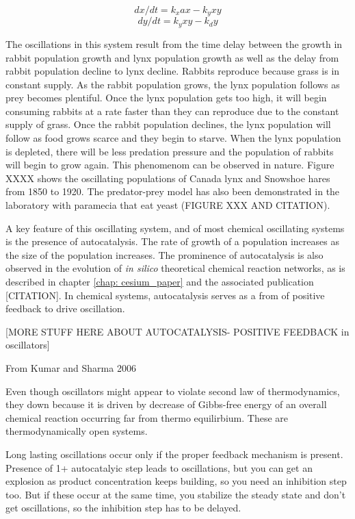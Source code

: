 \documentclass[12pt]{report}
\begin{document}
\begin{equation}
dx/dt = k_{x}ax - k_{y}xy
\end{equation}
\begin{equation}
dy/dt = k_{y}xy - k_{d}y
\end{equation}

The oscillations in this system result from the time delay between the growth in rabbit population growth and lynx population growth as well as the delay from rabbit population decline to lynx decline. Rabbits reproduce because grass is in constant supply. As the rabbit population grows, the lynx population follows as prey becomes plentiful. Once the lynx population gets too high, it will begin consuming rabbits at a rate faster than they can reproduce due to the constant supply of grass. Once the rabbit population declines, the lynx population will follow as food grows scarce and they begin to starve. When the lynx population is depleted, there will be less predation pressure and the population of rabbits will begin to grow again. This phenomenom can be observed in nature. Figure XXXX shows the oscillating populations of Canada lynx and Snowshoe hares from 1850 to 1920. The predator-prey model has also been demonstrated in the laboratory with paramecia that eat yeast (FIGURE XXX AND CITATION).

A key feature of this oscillating system, and of most chemical oscillating systems is the presence of autocatalysis. The rate of growth of a population increases as the size of the population increases. The prominence of autocatalysis is also observed in the evolution of \textit{in silico} theoretical chemical reaction networks, as is described in chapter \ref{chap: cesium_paper} and the associated publication [CITATION]. In chemical systems, autocatalysis serves as a from of positive feedback to drive oscillation.

[MORE STUFF HERE ABOUT AUTOCATALYSIS- POSITIVE FEEDBACK in oscillators]

From Kumar and Sharma 2006

Even though oscillators might appear to violate second law of thermodynamics, they down because it is driven by decrease of Gibbs-free energy of an overall chemical reaction occurring far from thermo equilirbium.  These are thermodynamically open systems.

Long lasting oscillations occur only if the proper feedback mechanism is present.
Presence of 1+ autocatalyic step leads to oscillations, but you can get an explosion as product concentration keeps building, so you need an inhibition step too. But if these occur at the same time, you stabilize the steady state and don't get oscillations, so the inhibition step has to be delayed.
\end{document}
